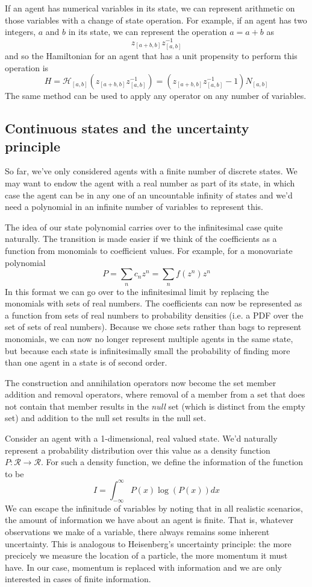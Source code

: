 \documentclass[letterpaper,twocolumn,10pt]{article}
\begin{document}
If an agent has numerical variables in its state, we can represent arithmetic on those variables with a change of state operation. For example, if an agent has two integers, $a$ and $b$ in its state, we can represent the operation $a = a + b$ as
\[
z_{[a+b,b]}z_{[a,b]}^{-1}
\]
and so the Hamiltonian for an agent that has a unit propensity to perform this operation is
\[
H = \mathcal{H}_{[a,b]}(z_{[a+b,b]}z_{[a,b]}^{-1}) = (z_{[a+b,b]}z_{[a,b]}^{-1}-1)N_{[a,b]}
\]
The same method can be used to apply any operator on any number of variables.

\subsection{Continuous states and the uncertainty principle}

So far, we've only considered agents with a finite number of discrete states. We may want to endow the agent with a real number as part of its state, in which case the agent can be in any one of an uncountable infinity of states and we'd need a polynomial in an infinite number of variables to represent this.

The idea of our state polynomial carries over to the infinitesimal case quite naturally. The transition is made easier if we think of the coefficients as a function from monomials to coefficient values. For example, for a monovariate polynomial
\[
P = \sum_n c_n z^n = \sum_n f(z^n)z^n 
\]
In this format we can go over to the infinitesimal limit by replacing the monomials with sets of real numbers. The coefficients can now be represented as a function from sets of real numbers to probability densities (i.e. a PDF over the set of sets of real numbers). Because we chose sets rather than bags to represent monomials, we can now no longer represent multiple agents in the same state, but because each state is infinitesimally small the probability of finding more than one agent in a state is of second order.

The construction and annihilation operators now become the set member addition and removal operators, where removal of a member from a set that does not contain that member results in the \textit{null} set  (which is distinct from the empty set) and addition to the null set results in the null set.

Consider an agent with a 1-dimensional, real valued state. We'd naturally represent a probability distribution over this value as a density function $P:\mathcal{R} \rightarrow \mathcal{R}$. For such a density function, we define the information of the function to be
\[
I = \int_{-\infty}^\infty P(x) \log(P(x)) dx
\]
We can escape the infinitude of variables by noting that in all realistic scenarios, the amount of information we have about an agent is finite. That is, whatever observations we make of a variable, there always remains some inherent uncertainty. This is analogous to Heisenberg's uncertainty principle: the more precicely we measure the location of a particle, the more momentum it must have. In our case, momentum is replaced with information and we are only interested in cases of finite information.
\end{document}
